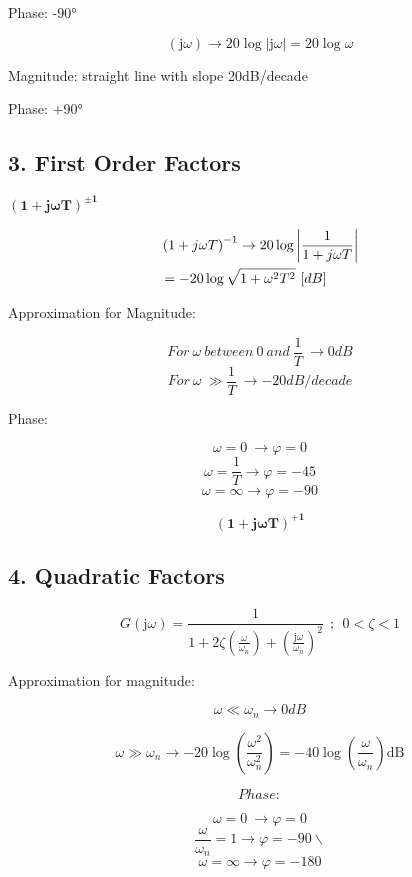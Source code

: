 \documentclass{report}
\theoremstyle{plain}
\theoremstyle{definition}
\theoremstyle{remark}
\begin{document}
Phase: -90°

\[\left( \text{j}\omega \right) \rightarrow 20\log\left| \text{j}\omega \right| = 20\log\omega\]

Magnitude: straight line with slope 20dB/decade

Phase: +90°

\subsection{3. First Order Factors}
\(\left( \mathbf{1 + j\omega T} \right)^{\mathbf{\pm 1}}\)

\begin{align}
& \left( 1 + j\omega T \right)^{- 1} \rightarrow 20\log\left| \frac{1}{1 + j\omega T} \right| \\ \notag
&= - 20\log\sqrt{1 + \omega^{2}T^{2}}\ \lbrack dB\rbrack
\end{align}

Approximation for Magnitude:

\[For\ \omega\ between\ 0\ and\ \frac{1}{T}\  \rightarrow 0dB\]
\[For\ \omega\  \gg \frac{1}{T} \  \rightarrow - 20dB/decade\]

Phase:

\[\omega = 0\  \rightarrow \varphi = 0\]
\[\omega = \frac{1}{T} \rightarrow \varphi = - 45\]
\[\omega = \infty \rightarrow \varphi = - 90 \]

\[\left( \mathbf{1 + j\omega T} \right)^{\mathbf{+ 1}}\]

\subsection{4. Quadratic Factors}

\[G\left( \text{j}\omega \right) = \frac{1}{1 + 2\zeta\left( \frac{\omega}{\omega_{n}} \right) + \left( \frac{\text{j}\omega}{\omega_{n}} \right)^{2}}\ \ ;\ \ 0 < \zeta < 1\]

Approximation for magnitude:

\[\omega \ll \omega_{n} \rightarrow 0dB\]

\[\omega \gg \omega_{n} \rightarrow - 20\log\left( \frac{\omega^{2}}{\omega_{n}^{2}} \right) = - 40\log{\left( \frac{\omega}{\omega_{n}} \right)\text{dB}}\]

\[Phase:\]

\[\omega = 0\  \rightarrow \varphi = 0\]
\[\frac{\omega}{\omega_{n}} = 1 \rightarrow \varphi = - 90\backslash \]
\[\omega = \infty \rightarrow \varphi = - 180 \]
\end{document}
